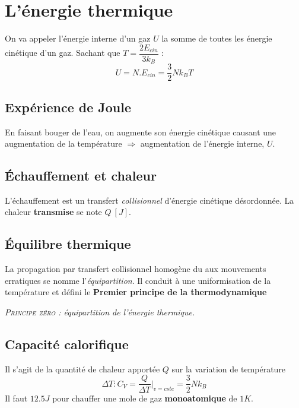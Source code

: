 \documentclass	[11pt, a4paper, openany]{book}
\begin{document}
\section{L'énergie thermique}
On va appeler l'énergie interne d'un gaz $U$ la somme de toutes les énergie cinétique d'un gaz. Sachant que $T = \dfrac{2E_{cin}}{3k_B}$ :
\begin{equation}
U = N.E_{cin} = \frac{3}{2}Nk_BT
\end{equation}


\subsection{Expérience de Joule}
En faisant bouger de l'eau, on augmente son énergie cinétique causant une augmentation de la température $\Rightarrow$ augmentation de l'énergie interne, $U$.

\subsection{Échauffement et chaleur}
L'échauffement est un transfert \textit{collisionnel} d'énergie cinétique désordonnée. La chaleur \textbf{transmise} se note $Q\ [J]$.

\subsection{Équilibre thermique}
La propagation par transfert collisionnel homogène du aux mouvements erratiques se nomme l'\textit{équipartition}. Il conduit à une uniformisation de la température et défini le \textbf{Premier principe de la thermodynamique}
\begin{center}
\textit{\textsc{Principe zéro :} équipartition de l'énergie thermique.}
\end{center}

\subsection{Capacité calorifique}
Il s'agit de la quantité de chaleur apportée $Q$ sur la variation de température 
\begin{equation}
\Delta T : C_V = \dfrac{Q}{\Delta T}|_{v=cste} = \frac{3}{2}Nk_B
\end{equation}
Il faut $12.5J$ pour chauffer une mole de gaz \textbf{monoatomique} de $1K$.
\end{document}
